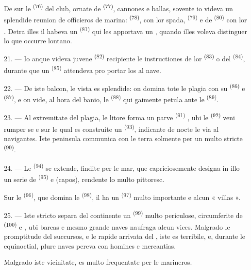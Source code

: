 De sur le  \textsuperscript{(76)} del club, ornate de
 \textsuperscript{(77)}, cannones e ballas, sovente io videva un
splendide reunion de officieros de marina: 
\textsuperscript{(78)}, con lor spada, 
\textsuperscript{(79)} e de  \textsuperscript{(80)} con lor
. Detra illes il habeva un 
\textsuperscript{(81)} qui les apportava un , quando illes
voleva distinguer lo que occurre lontano.

21. --- Io anque videva juvene  \textsuperscript{(82)}
recipiente le instructiones de lor  \textsuperscript{(83)} o
del  \textsuperscript{(84)}, durante que un 
\textsuperscript{(85)} attendeva pro portar los al nave.

22. --- De iste balcon, le vista es splendide: on domina tote le plagia con su
 \textsuperscript{(86)} e  \textsuperscript{(87)},
e on vide, al hora del banio, le  \textsuperscript{(88)} qui
gaimente petula ante le  \textsuperscript{(89)}.

23. --- Al extremitate del plagia, le litore forma un parve 
\textsuperscript{(91)} , ubi le 
\textsuperscript{(92)} veni rumper se e sur le qual es construite un 
\textsuperscript{(93)}, indicante de nocte le via al navigantes. Iste peninsula
communica con le terra solmente per un  multo stricte
\textsuperscript{(90)}.

\VUsaut{3.0mm}
\VUsaut{3.0mm}

24. --- Le  \textsuperscript{(94)} se extende, findite per le
mar, que capriciosemente designa in illo un serie de 
\textsuperscript{(95)} e  (capos), rendente lo multo
pittoresc.

Sur le  \textsuperscript{(96)}, que domina le
 \textsuperscript{(98)}, il ha un 
\textsuperscript{(97)} multo importante e alcun « villas ».

25. --- Iste stricto separa del continente un 
\textsuperscript{(99)} multo periculose, circumferite de 
\textsuperscript{(100)} e , ubi barcas e mesmo grande naves
naufraga alcun vices. Malgrado le promptitude del succursos, e le rapide arrivata
del , iste  es terribile, e,
durante le  equinoctial, plure naves pereva con homines e
mercantias.

Malgrado iste vicinitate,  es multo frequentate per le
marineros.
\VUsaut{6.0mm}
\VUfilet{22mm}
